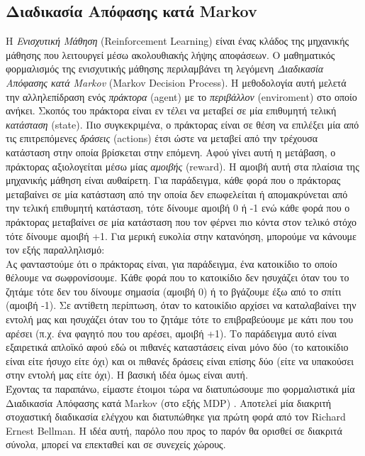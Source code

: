 \documentclass[11pt]{article} %
\numberwithin{equation}{subsection}
\begin{document}
\subsection{Διαδικασία Απόφασης κατά Markov}

Η \textit{Ενισχυτική Μάθηση} (Reinforcement Learning) είναι ένας κλάδος της μηχανικής μάθησης που λειτουργεί μέσω ακολουθιακής λήψης αποφάσεων. Ο μαθηματικός φορμαλισμός της ενισχυτικής μάθησης περιλαμβάνει τη λεγόμενη \textit{Διαδικασία Απόφασης κατά Markov} (Markov Decision Process). Η μεθοδολογία αυτή μελετά την αλληλεπίδραση ενός \textit{πράκτορα} (agent) με το \textit{περιβάλλον} (enviroment) στο οποίο ανήκει. Σκοπός του πράκτορα είναι εν τέλει να μεταβεί σε μία επιθυμητή τελική \textit{κατάσταση} (state). Πιο συγκεκριμένα, ο πράκτορας είναι σε θέση να επιλέξει μία από τις επιτρεπόμενες \textit{δράσεις} (actions) έτσι ώστε να μεταβεί από την τρέχουσα κατάσταση στην οποία βρίσκεται στην επόμενη. Αφού γίνει αυτή η μετάβαση, ο πράκτορας αξιολογείται μέσω μίας \textit{αμοιβής} (reward). Η αμοιβή αυτή στα πλαίσια της μηχανικής μάθηση είναι αυθαίρετη. Για παράδειγμα, κάθε φορά που ο πράκτορας μεταβαίνει σε μία κατάσταση από την οποία δεν επωφελείται ή απομακρύνεται από την τελική επιθυμητή κατάσταση, τότε δίνουμε αμοιβή 0 ή -1 ενώ κάθε φορά που ο πράκτορας μεταβαίνει σε μία κατάσταση που τον φέρνει πιο κόντα στον τελικό στόχο τότε δίνουμε αμοιβή +1. Για μερική ευκολία στην κατανόηση, μπορούμε να κάνουμε τον εξής παραλληλισμό: \\

Ας φανταστούμε ότι ο πράκτορας είναι, για παράδειγμα, ένα κατοικίδιο το οποίο θέλουμε να σωφρονίσουμε. Κάθε φορά που το κατοικίδιο δεν ησυχάζει όταν του το ζητάμε τότε δεν του δίνουμε σημασία (αμοιβή 0) ή το βγάζουμε έξω από το σπίτι (αμοιβή -1). Σε αντίθετη περίπτωση, όταν το κατοικίδιο αρχίσει να καταλαβαίνει την εντολή μας και ησυχάζει όταν του το ζητάμε τότε το επιβραβεύουμε με κάτι που του αρέσει (π.χ. ένα φαγητό που του αρέσει, αμοιβή +1). Το παράδειγμα αυτό είναι εξαιρετικά απλοϊκό αφού εδώ οι πιθανές καταστάσεις είναι μόνο δύο (το κατοικίδιο είναι είτε ήσυχο είτε όχι) και οι πιθανές δράσεις είναι επίσης δύο (είτε να υπακούσει στην εντολή μας είτε όχι). Η βασική ιδέα όμως είναι αυτή. \\

Έχοντας τα παραπάνω, είμαστε έτοιμοι τώρα να διατυπώσουμε πιο φορμαλιστικά μία Διαδικασία Απόφασης κατά Markov (στο εξής MDP) \cite{reinflearning}. Αποτελεί μία διακριτή στοχαστική διαδικασία ελέγχου και διατυπώθηκε για πρώτη φορά από τον Richard Ernest Bellman. Η ιδέα αυτή, παρόλο που προς το παρόν θα ορισθεί σε διακριτά σύνολα, μπορεί να επεκταθεί και σε συνεχείς χώρους.\\
\end{document}
